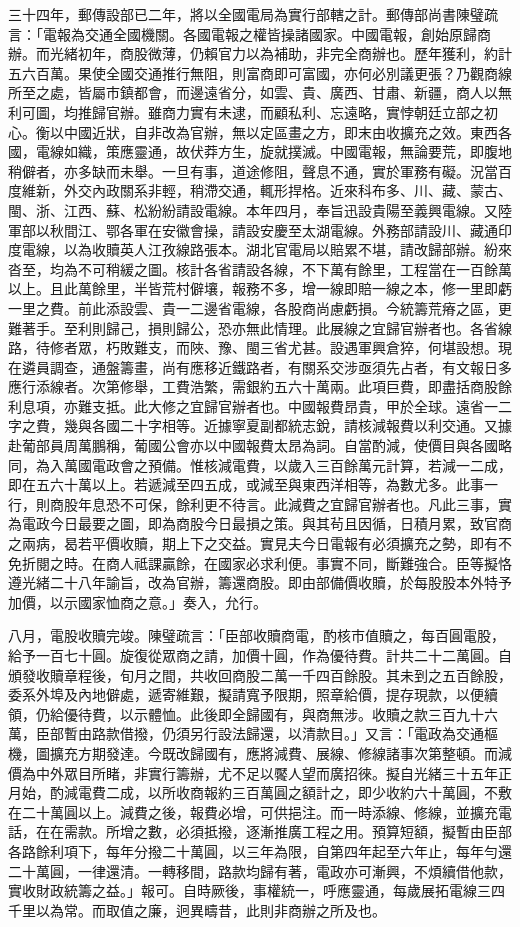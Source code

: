 \begin{pinyinscope}
三十四年，郵傳設部已二年，將以全國電局為實行部轄之計。郵傳部尚書陳璧疏言：「電報為交通全國機關。各國電報之權皆操諸國家。中國電報，創始原歸商辦。而光緒初年，商股微薄，仍賴官力以為補助，非完全商辦也。歷年獲利，約計五六百萬。果使全國交通推行無阻，則富商即可富國，亦何必別議更張？乃觀商線所至之處，皆屬市鎮都會，而邊遠省分，如雲、貴、廣西、甘肅、新疆，商人以無利可圖，均推歸官辦。雖商力實有未逮，而顧私利、忘遠略，實悖朝廷立部之初心。衡以中國近狀，自非改為官辦，無以定區畫之方，即末由收擴充之效。東西各國，電線如織，策應靈通，故伏莽方生，旋就撲滅。中國電報，無論要荒，即腹地稍僻者，亦多缺而未舉。一旦有事，道途修阻，聲息不通，實於軍務有礙。況當百度維新，外交內政關系非輕，稍滯交通，輒形捍格。近來科布多、川、藏、蒙古、閩、浙、江西、蘇、松紛紛請設電線。本年四月，奉旨迅設貴陽至義興電線。又陸軍部以秋間江、鄂各軍在安徽會操，請設安慶至太湖電線。外務部請設川、藏通印度電線，以為收贖英人江孜線路張本。湖北官電局以賠累不堪，請改歸部辦。紛來沓至，均為不可稍緩之圖。核計各省請設各線，不下萬有餘里，工程當在一百餘萬以上。且此萬餘里，半皆荒村僻壤，報務不多，增一線即賠一線之本，修一里即虧一里之費。前此添設雲、貴一二邊省電線，各股商尚慮虧損。今統籌荒瘠之區，更難著手。至利則歸己，損則歸公，恐亦無此情理。此展線之宜歸官辦者也。各省線路，待修者眾，朽敗難支，而陜、豫、閩三省尤甚。設遇軍興倉猝，何堪設想。現在遴員調查，通盤籌畫，尚有應移近鐵路者，有關系交涉亟須先占者，有文報日多應行添線者。次第修舉，工費浩繁，需銀約五六十萬兩。此項巨費，即盡括商股餘利息項，亦難支抵。此大修之宜歸官辦者也。中國報費昂貴，甲於全球。遠省一二字之費，幾與各國二十字相等。近據寧夏副都統志銳，請核減報費以利交通。又據赴葡部員周萬鵬稱，葡國公會亦以中國報費太昂為詞。自當酌減，使價目與各國略同，為入萬國電政會之預備。惟核減電費，以歲入三百餘萬元計算，若減一二成，即在五六十萬以上。若遞減至四五成，或減至與東西洋相等，為數尤多。此事一行，則商股年息恐不可保，餘利更不待言。此減費之宜歸官辦者也。凡此三事，實為電政今日最要之圖，即為商股今日最損之策。與其茍且因循，日積月累，致官商之兩病，曷若平價收贖，期上下之交益。實見夫今日電報有必須擴充之勢，即有不免折閱之時。在商人祗課贏餘，在國家必求利便。事實不同，斷難強合。臣等擬恪遵光緒二十八年諭旨，改為官辦，籌還商股。即由部備價收贖，於每股股本外特予加價，以示國家恤商之意。」奏入，允行。

八月，電股收贖完竣。陳璧疏言：「臣部收贖商電，酌核市值贖之，每百圓電股，給予一百七十圓。旋復從眾商之請，加價十圓，作為優待費。計共二十二萬圓。自頒發收贖章程後，旬月之間，共收回商股二萬一千四百餘股。其未到之五百餘股，委系外埠及內地僻處，遞寄維艱，擬請寬予限期，照章給價，提存現款，以便續領，仍給優待費，以示體恤。此後即全歸國有，與商無涉。收贖之款三百九十六萬，臣部暫由路款借撥，仍須另行設法歸還，以清款目。」又言：「電政為交通樞機，圖擴充方期發達。今既改歸國有，應將減費、展線、修線諸事次第整頓。而減價為中外眾目所睹，非實行籌辦，尤不足以饜人望而廣招徠。擬自光緒三十五年正月始，酌減電費二成，以所收商報約三百萬圓之額計之，即少收約六十萬圓，不敷在二十萬圓以上。減費之後，報費必增，可供挹注。而一時添線、修線，並擴充電話，在在需款。所增之數，必須抵撥，逐漸推廣工程之用。預算短額，擬暫由臣部各路餘利項下，每年分撥二十萬圓，以三年為限，自第四年起至六年止，每年勻還二十萬圓，一律還清。一轉移間，路款均歸有著，電政亦可漸興，不煩續借他款，實收財政統籌之益。」報可。自時厥後，事權統一，呼應靈通，每歲展拓電線三四千里以為常。而取值之廉，迥異疇昔，此則非商辦之所及也。


\end{pinyinscope}
